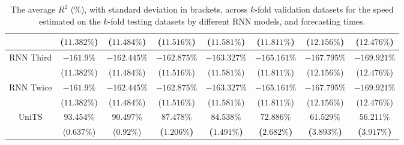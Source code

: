 \begin{table}[!ht]
{\begin{tabular}{|c|c|c|c|c|c|c|c|}
			 & ($11.382\%$) & ($11.484\%$) & ($11.516\%$) & ($11.581\%$) & ($11.811\%$) & ($12.156\%$) & ($12.476\%$) \\ \hline
			\multirow{2}{*}{RNN Third} & $-161.9\%$ & $-162.445\%$ & $-162.875\%$ & $-163.327\%$ & $-165.161\%$ & $-167.795\%$ & $-169.921\%$ \\
			 & ($11.382\%$) & ($11.484\%$) & ($11.516\%$) & ($11.581\%$) & ($11.811\%$) & ($12.156\%$) & ($12.476\%$) \\ \hline
			\multirow{2}{*}{RNN Twice} & $-161.9\%$ & $-162.445\%$ & $-162.875\%$ & $-163.327\%$ & $-165.161\%$ & $-167.795\%$ & $-169.921\%$ \\
			 & ($11.382\%$) & ($11.484\%$) & ($11.516\%$) & ($11.581\%$) & ($11.811\%$) & ($12.156\%$) & ($12.476\%$) \\ \hline
			\multirow{2}{*}{UniTS} & $93.454\%$ & $90.497\%$ & $\mathbf{87.478\%}$ & $\mathbf{84.538\%}$ & $\mathbf{72.886\%}$ & $\mathbf{61.529\%}$ & $\mathbf{56.211\%}$ \\
			 & ($0.637\%$) & ($0.92\%$) & \textbf{(}$\mathbf{1.206\%}$\textbf{)} & \textbf{(}$\mathbf{1.491\%}$\textbf{)} & \textbf{(}$\mathbf{2.682\%}$\textbf{)} & \textbf{(}$\mathbf{3.893\%}$\textbf{)} & \textbf{(}$\mathbf{3.917\%}$\textbf{)} \\ \hline
		\end{tabular}
	}
	\caption{The average $R^{2}$ (\%), with standard deviation in brackets, across $k$-fold validation datasets for the speed estimated on the $k$-fold testing datasets by different RNN models, and forecasting times.}
	\label{tab:all_speed_R2}
\end{table}

